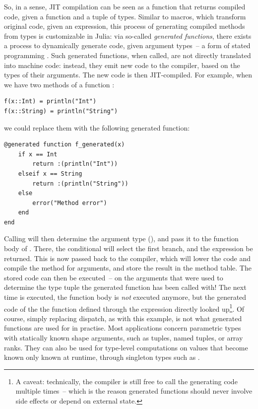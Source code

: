 So, in a sense, JIT compilation can be seen as a function that returns compiled code, given a
function and a tuple of types.  Similar to macros, which transform original code, given an
expression, this process of generating compiled methods from types is customizable in Julia: via
so-called \emph{generated functions}, there exists a process to dynamically generate code, given
argument types~-- a form of stated programming
\parencite{rompf2010lightweight,bolewski2015staged}. Such generated functions, when called, are not
directly translated into machine code: instead, they emit new code to the compiler, based on the
types of their arguments.  The new code is then JIT-compiled.  For example, when we have two methods
of a function :
\begin{lstlisting}
f(x::Int) = println("Int")
f(x::String) = println("String")
\end{lstlisting}
we could replace them with the following generated function:
\begin{lstlisting}
@generated function f_generated(x)
    if x == Int
        return :(println("Int"))
    elseif x == String
        return :(println("String"))
    else
        error("Method error")
    end
end
\end{lstlisting}
Calling  will then determine the argument type (), and
pass it to the function body of .  There, the conditional will select the first
branch, and the expression  be returned.  This is now passed back to the
compiler, which will lower the code and compile the method for  arguments, and store the
result in the method table.  The stored code can then be executed~-- on the arguments that were used
to determine the type tuple the generated function has been called with!  The next time
 is executed, the function body is \emph{not} executed anymore, but the generated
code of the the function defined through the expression  directly looked
up\footnote{A caveat: technically, the compiler is still free to call the generating code multiple
  times~-- which is the reason generated functions should never involve side effects or depend on
  external state.}.  Of course, simply replacing dispatch, as with this example, is not what
generated functions are used for in practise.  Most applications concern parametric types with
statically known shape arguments, such as tuples, named tuples, or array ranks.  They can also be
used for type-level computations on values that become known only known at runtime, through
singleton types such as .

